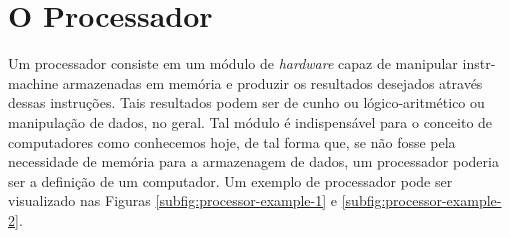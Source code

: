 \section{O Processador}

\label{sec:processor}

Um processador consiste em um módulo de \textit{hardware} capaz de manipular
\gls{instr-machine} armazenadas
em memória e produzir os resultados desejados através dessas instruções. Tais resultados
podem ser de cunho ou lógico-aritmético ou manipulação de dados, no geral. Tal módulo é
indispensável para o conceito de computadores como conhecemos hoje, de tal forma que, se
não fosse pela necessidade de memória para a armazenagem de dados, um processador poderia
ser a definição de um computador. Um exemplo de processador pode ser visualizado nas Figuras
\ref{subfig:processor-example-1} e \ref{subfig:processor-example-2}.

